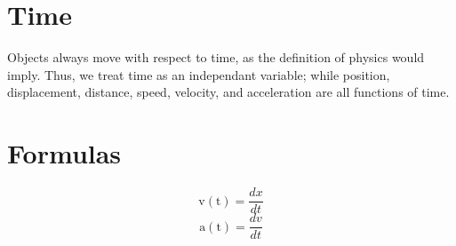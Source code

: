 \documentclass{article}
\newcommand{\diff}[1]{\frac{#1}{dt}}
\begin{document}
	\section{Time}
	Objects always move with respect to time, as the definition of physics would imply. Thus, we treat time as an independant variable; while position, displacement,
	distance, speed, velocity, and acceleration are all functions of time.
	\section{Formulas}
	\[\mathrm{v(t)} = \diff{dx}\]
	\[\mathrm{a(t)} = \diff{dv}\]
\end{document}
